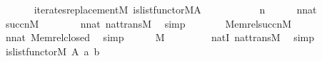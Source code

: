 \begin{isabellebody}
\ \ \isanewline
\ \ \ \ {\isachardoublequoteopen}iterates{\isacharunderscore}{\kern0pt}replacement{\isacharparenleft}{\kern0pt}{\isacharhash}{\kern0pt}{\isacharhash}{\kern0pt}M{\isacharcomma}{\kern0pt}\ is{\isacharunderscore}{\kern0pt}list{\isacharunderscore}{\kern0pt}functor{\isacharparenleft}{\kern0pt}{\isacharhash}{\kern0pt}{\isacharhash}{\kern0pt}M{\isacharcomma}{\kern0pt}A{\isacharparenright}{\kern0pt}{\isacharcomma}{\kern0pt}\ {}{\isacharparenright}{\kern0pt}{\isachardoublequoteclose}\isanewline
%
\isadelimproof
%
\endisadelimproof
%
\isatagproof
{}\isamarkupfalse%
\ {\isacharminus}{\kern0pt}\isanewline
\ \ \isacommand{{\isacharbraceleft}{\kern0pt}}\isamarkupfalse%
\isanewline
\ \ \ \ \isamarkupfalse%
\ n\isanewline
\ \ \ \ \isamarkupfalse%
\ {\isachardoublequoteopen}n{\isasymin}nat{\isachardoublequoteclose}\isanewline
\ \ \ \ \isamarkupfalse%
\ {\isachardoublequoteopen}succ{\isacharparenleft}{\kern0pt}n{\isacharparenright}{\kern0pt}{\isasymin}M{\isachardoublequoteclose}\isanewline
\ \ \ \ \ \ \isamarkupfalse%
\ {\isacartoucheopen}n{\isasymin}nat{\isacartoucheclose}\ nat{\isacharunderscore}{\kern0pt}trans{\isacharunderscore}{\kern0pt}M\ \isamarkupfalse%
\ simp\isanewline
\ \ \ \ \isamarkupfalse%
\ \isamarkupfalse%
\ {}{\isacharcolon}{\kern0pt}{\isachardoublequoteopen}Memrel{\isacharparenleft}{\kern0pt}succ{\isacharparenleft}{\kern0pt}n{\isacharparenright}{\kern0pt}{\isacharparenright}{\kern0pt}{\isasymin}M{\isachardoublequoteclose}\isanewline
\ \ \ \ \ \ \isamarkupfalse%
\ {\isacartoucheopen}n{\isasymin}nat{\isacartoucheclose}\ Memrel{\isacharunderscore}{\kern0pt}closed\ \isamarkupfalse%
\ simp\isanewline
\ \ \ \ \isamarkupfalse%
\ {\isachardoublequoteopen}{}{\isasymin}M{\isachardoublequoteclose}\isanewline
\ \ \ \ \ \ \isamarkupfalse%
\ \ nat{\isacharunderscore}{\kern0pt}{}I\ nat{\isacharunderscore}{\kern0pt}trans{\isacharunderscore}{\kern0pt}M\ \isamarkupfalse%
\ simp\isanewline
\ \ \ \ \isamarkupfalse%
\ \isamarkupfalse%
\ {\isachardoublequoteopen}is{\isacharunderscore}{\kern0pt}list{\isacharunderscore}{\kern0pt}functor{\isacharparenleft}{\kern0pt}{\isacharhash}{\kern0pt}{\isacharhash}{\kern0pt}M{\isacharcomma}{\kern0pt}\ A{\isacharcomma}{\kern0pt}\ a{\isacharcomma}{\kern0pt}\ b{\isacharparenright}{\kern0pt}\isanewline

\end{isabellebody}
